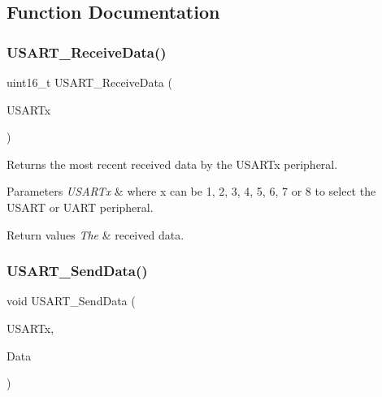 \subsection{Function Documentation}
\mbox{\label{group___u_s_a_r_t___group2_gac67a91845b0b1d54d31bdfb1c5e9867c}} 
\subsubsection{\texorpdfstring{U\+S\+A\+R\+T\+\_\+\+Receive\+Data()}{USART\_ReceiveData()}}
{\footnotesize\ttfamily uint16\+\_\+t U\+S\+A\+R\+T\+\_\+\+Receive\+Data (\begin{DoxyParamCaption}\item[{U\+S\+A\+R\+T\+\_\+\+Type\+Def $\ast$}]{U\+S\+A\+R\+Tx }\end{DoxyParamCaption})}



Returns the most recent received data by the U\+S\+A\+R\+Tx peripheral. 


\begin{DoxyParams}{Parameters}
{\em U\+S\+A\+R\+Tx} & where x can be 1, 2, 3, 4, 5, 6, 7 or 8 to select the U\+S\+A\+RT or U\+A\+RT peripheral. \\
\hline
\end{DoxyParams}

\begin{DoxyRetVals}{Return values}
{\em The} & received data. \\
\hline
\end{DoxyRetVals}
\mbox{\label{group___u_s_a_r_t___group2_ga0b43d42da9540f446d494bf69823c6fb}} 
\subsubsection{\texorpdfstring{U\+S\+A\+R\+T\+\_\+\+Send\+Data()}{USART\_SendData()}}
{\footnotesize\ttfamily void U\+S\+A\+R\+T\+\_\+\+Send\+Data (\begin{DoxyParamCaption}\item[{U\+S\+A\+R\+T\+\_\+\+Type\+Def $\ast$}]{U\+S\+A\+R\+Tx,  }\item[{uint16\+\_\+t}]{Data }\end{DoxyParamCaption})}




